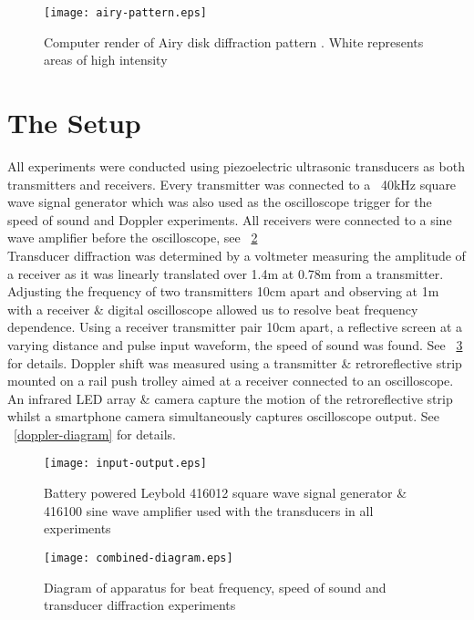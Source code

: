 \documentclass[a4paper,10pt,journal]{IEEEtran}
\newcommand{\figref}[2][\figurename~]{#1\ref{#2}}
\begin{document}
\begin{figure}
	\centering
	\texttt{[image: airy-pattern.eps]}
	\caption{Computer render of Airy disk diffraction pattern \cite{airy-pattern}. White represents areas of high intensity}
	\label{airy-pattern}
\end{figure}

\section{The Setup}
All experiments were conducted using piezoelectric ultrasonic transducers as both transmitters and receivers. Every transmitter was connected to a ~40kHz square wave signal generator which was also used as the oscilloscope trigger for the speed of sound and Doppler experiments. All receivers were connected to a sine wave amplifier before the oscilloscope, see \figref{input-output}\\
Transducer diffraction was determined by a voltmeter measuring the amplitude of a receiver as it was linearly translated over 1.4m at 0.78m from a transmitter. Adjusting the frequency of two transmitters 10cm apart and observing at 1m with a receiver \& digital oscilloscope allowed us to resolve beat frequency dependence. Using a receiver transmitter pair 10cm apart, a reflective screen at a varying distance and pulse input waveform, the speed of sound was found. See \figref{combined-diagram} for details.
Doppler shift was measured using a transmitter \& retroreflective strip mounted on a rail push trolley aimed at a receiver connected to an oscilloscope. An infrared LED array \& camera capture the motion of the retroreflective strip whilst a smartphone camera simultaneously captures oscilloscope output. See \figref{doppler-diagram} for details.

\begin{figure}
	\centering
	\texttt{[image: input-output.eps]}
	\caption{Battery powered Leybold 416012 square wave signal generator \& 416100 sine wave amplifier \cite{echo-sounder-principles} used with the transducers in all experiments}
	\label{input-output}
\end{figure}

\begin{figure}
	\centering
	\texttt{[image: combined-diagram.eps]}
	\caption{Diagram of apparatus for beat frequency, speed of sound and transducer diffraction experiments}
	\label{combined-diagram}
\end{figure}
\end{document}
